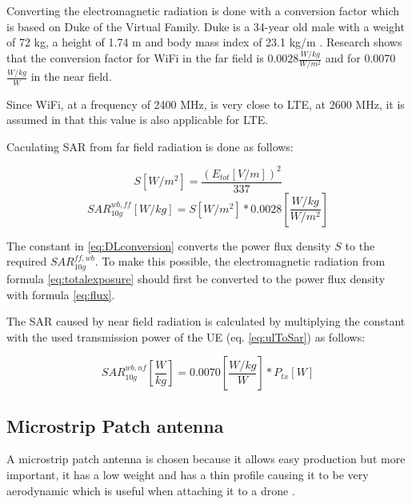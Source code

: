 \documentclass[twocolumn]{phdsymp} %
\begin{document}
Converting the electromagnetic radiation is done with a conversion factor which is based 
on Duke of the Virtual Family. Duke is a 34-year old male with a weight of 72 kg, a height of 1.74 m and body
mass index of 23.1 kg/m \cite{J22_plets2015joint}. 
Research shows that the conversion factor for WiFi in the far field is $0.0028 \frac{W/kg}{W/m^2}$
and for 0.0070 $\frac{W/kg}{W}$ \cite{J22_plets2015joint} in the near field.

Since WiFi, at a frequency of 2400 MHz,
is very close to LTE, at 2600 MHz, it is assumed in \cite{J22_plets2015joint} that this value is also applicable for \gls{LTE}.

Caculating \gls{SAR} from far field radiation is done as follows:

\begin{equation}
S [W/m^2]= \frac{(E_{tot} [V/m])^2}{337}
\label{eq:flux}
\end{equation}
\begin{equation}
SAR^{wb,ff}_{10g} [W/kg]= S [W/m^2]* 0.0028 \left[\frac{W/kg}{W/m^2}\right]
\label{eq:DLconversion}
\end{equation}

The constant in \ref{eq:DLconversion} converts the \gls{power flux density} $S$ to the required $SAR^{ff,wb}_{10g}$.
To make this possible, the electromagnetic radiation
from formula \ref{eq:totalexposure} should first be converted to the  \gls{power flux density} with formula 
\ref{eq:flux}.

The SAR caused by near field radiation is calculated by multiplying the constant with the used transmission
power of the \gls{UE} (eq. \ref{eq:ulToSar}) 
as follows:

\begin{equation} 
SAR^{wb,nf}_{10g} \left[\frac{W}{kg}\right] = 0.0070 \left[\frac{W/kg}{W}\right] * P_{tx} [W]
\label{eq:ulToSar}
\end{equation}

\subsection{Microstrip Patch antenna}
A microstrip patch antenna is chosen because it allows easy production but more important, it has a low weight 
and has a thin profile causing it to be very aerodynamic which is useful when attaching it to a drone \cite{J13_microstripadvantages}.
\end{document}
